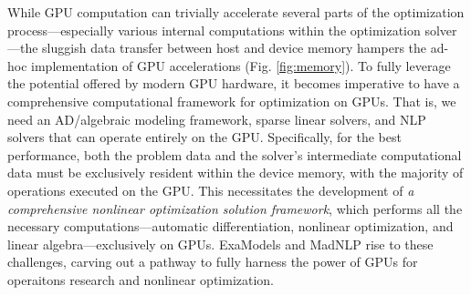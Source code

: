 \documentclass{article}
\begin{document}
While GPU computation can trivially accelerate several parts of the optimization process---especially various internal computations within the optimization solver---the sluggish data transfer between host and device memory hampers the ad-hoc implementation of GPU accelerations (Fig. \ref{fig:memory}). To fully leverage the potential offered by modern GPU hardware, it becomes imperative to have a comprehensive computational framework for optimization on GPUs. That is, we need an AD/algebraic modeling framework, sparse linear solvers, and NLP solvers that can operate entirely on the GPU. Specifically, for the best performance, both the problem data and the solver's intermediate computational data must be exclusively resident within the device memory, with the majority of operations executed on the GPU. This necessitates the development of {\it a comprehensive nonlinear optimization solution framework}, which performs all the necessary computations---automatic differentiation, nonlinear optimization, and linear algebra---exclusively on GPUs. ExaModels and MadNLP rise to these challenges, carving out a pathway to fully harness the power of GPUs for operaitons research and nonlinear optimization. 
\end{document}
